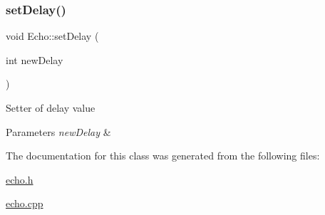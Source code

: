 \subsubsection{\texorpdfstring{set\+Delay()}{setDelay()}}
{\footnotesize\ttfamily void Echo\+::set\+Delay (\begin{DoxyParamCaption}\item[{int}]{new\+Delay }\end{DoxyParamCaption})}

Setter of delay value 
\begin{DoxyParams}{Parameters}
{\em new\+Delay} & \\
\hline
\end{DoxyParams}


The documentation for this class was generated from the following files\+:\begin{DoxyCompactItemize}
\item 
\hyperlink{echo_8h}{echo.\+h}\item 
\hyperlink{echo_8cpp}{echo.\+cpp}\end{DoxyCompactItemize}
